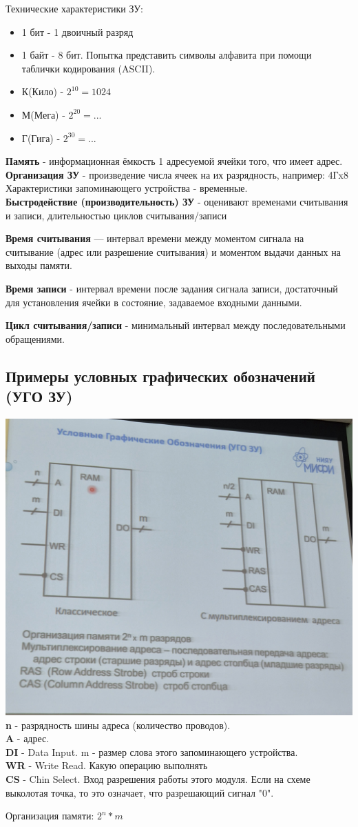 \documentclass[12px]{article}
\begin{document}
Технические характеристики ЗУ: 
\begin{itemize}
    \item 1 бит - 1 двоичный разряд
    \item 1 байт - 8 бит. Попытка представить символы алфавита при помощи таблички кодирования (ASCII).
    \item К(Кило) - $2^{10} = 1024$
    \item М(Мега) - $2^{20} = ... $ 
    \item Г(Гига) - $2^{30} = ... $
\end{itemize}

\textbf{Память} - информационная ёмкость 1 адресуемой ячейки того, что имеет адрес. \\

\textbf{Организация ЗУ} - произведение числа ячеек на их разрядность, например: 4Гx8\\
Характеристики запоминающего устройства - временные.\\

\textbf{Быстродействие (производительность) ЗУ} - оценивают временами считывания и записи, длительностью циклов считывания/записи

\textbf{Время считывания} — интервал времени между моментом сигнала на считывание (адрес или разрешение считывания) и моментом выдачи данных на выходы памяти.

\textbf{Время записи} - интервал времени после задания сигнала записи, достаточный для установления ячейки в состояние, задаваемое входными данными.

\textbf{Цикл считывания/записи} - минимальный интервал между последовательными обращениями.
\subsection{Примеры условных графических обозначений (УГО ЗУ)}
\includegraphics[width=0.5\linewidth]{images/УГО ЗУ.jpg}\\
\textbf{n} - разрядность шины адреса (количество проводов). \\
\textbf{A} - адрес.\\
\textbf{DI} - Data Input. m - размер слова этого запоминающего устройства.\\
\textbf{WR} - Write Read. Какую операцию выполнять\\
\textbf{CS} - Chin Select. Вход разрешения работы этого модуля. Если на схеме выколотая точка, то это означает, что разрешающий сигнал "0".

Организация памяти: $2^n * m$
\end{document}
